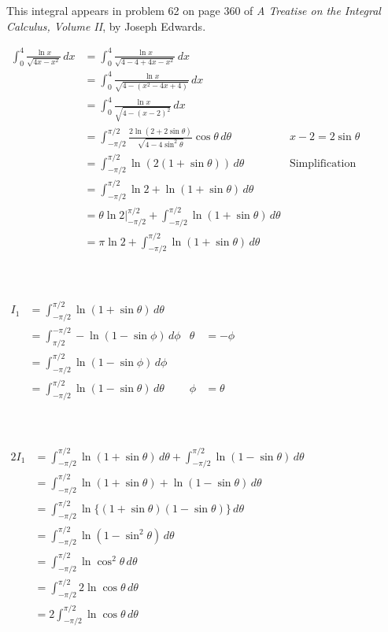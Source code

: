 \documentclass{article}
\newcommand{\explnspacei}{\hspace{0in}}		%
\newcommand{\explnspaceii}{\hspace{0in}}
\begin{document}
\noindent
This integral appears in problem 62 on page 360 of \textit{A Treatise on the Integral Calculus, Volume II}, by Joseph Edwards.
\\
\par\noindent
$\begin{aligned}
\int_0^4 \frac{\ln{x}}{\sqrt{4x - x^2}} \, dx & = \int_0^4 \frac{\ln{x}}{\sqrt{4 - 4 + 4x - x^2}} \, dx \\		%
& = \int_0^4 \frac{\ln{x}}{\sqrt{4 - (x^2 - 4x + 4)}} \, dx \\
& = \int_0^4 \frac{\ln{x}}{\sqrt{4 - (x - 2) ^ 2}} \, dx \\
& = \int_{-\pi / 2}^{\pi / 2} \frac{2 \ln{(2 + 2 \sin \theta)}}{\sqrt{4 - 4 \sin^2 \theta}} \cos \theta \, d\theta & \explnspacei x - 2 = 2 \sin \theta \\
& = \int_{-\pi / 2}^{\pi / 2} \ln{(2(1 + \sin \theta))} \, d\theta & \explnspacei \text{Simplification} \\
& = \int_{-\pi / 2}^{\pi / 2} \ln{2} + \ln{(1 + \sin \theta)} \, d\theta \\
& = \theta \ln 2 \biggr\rvert_{-\pi / 2}^{\pi / 2} + \int_{-\pi / 2}^{\pi / 2} \ln{(1 + \sin \theta)} \, d\theta \\	%
& = \pi \ln 2 + \int_{-\pi / 2}^{\pi / 2} \ln{(1 + \sin \theta)} \, d\theta
\end{aligned}$
\\ \\ \\
\par\noindent
$\begin{aligned}
I_1 & = \int_{-\pi / 2}^{\pi / 2} \ln{(1 + \sin \theta)} \, d\theta \\
& = \int_{\pi / 2}^{-\pi / 2} -\ln{(1 - \sin \phi)} \, d\phi & \explnspaceii \theta & = - \phi \\
& = \int_{-\pi / 2}^{\pi / 2} \ln{(1 - \sin \phi)} \, d\phi \\
& = \int_{-\pi / 2}^{\pi / 2} \ln{(1 - \sin \theta)} \, d\theta & \explnspaceii \phi & = \theta
\end{aligned}$
\\ \\ \\
\par\noindent
$\begin{aligned}
2I_1 & = \int_{-\pi / 2}^{\pi / 2} \ln{(1 + \sin \theta)} \, d\theta + \int_{-\pi / 2}^{\pi / 2} \ln{(1 - \sin \theta)} \, d\theta \\
& = \int_{-\pi / 2}^{\pi / 2} \ln{(1 + \sin \theta)} + \ln{(1 - \sin \theta)} \, d\theta \\
& = \int_{-\pi / 2}^{\pi / 2} \ln{\{(1 + \sin \theta)(1 - \sin \theta)\}} \, d\theta \\
& = \int_{-\pi / 2}^{\pi / 2} \ln{(1 - \sin^2 \theta)} \, d\theta \\
& = \int_{-\pi / 2}^{\pi / 2} \ln{\cos^2 \theta} \, d\theta \\
& = \int_{-\pi / 2}^{\pi / 2} 2 \ln{\cos \theta} \, d\theta \\
& = 2 \int_{-\pi / 2}^{\pi / 2} \ln{\cos \theta} \, d\theta
\end{aligned}$
\end{document}
